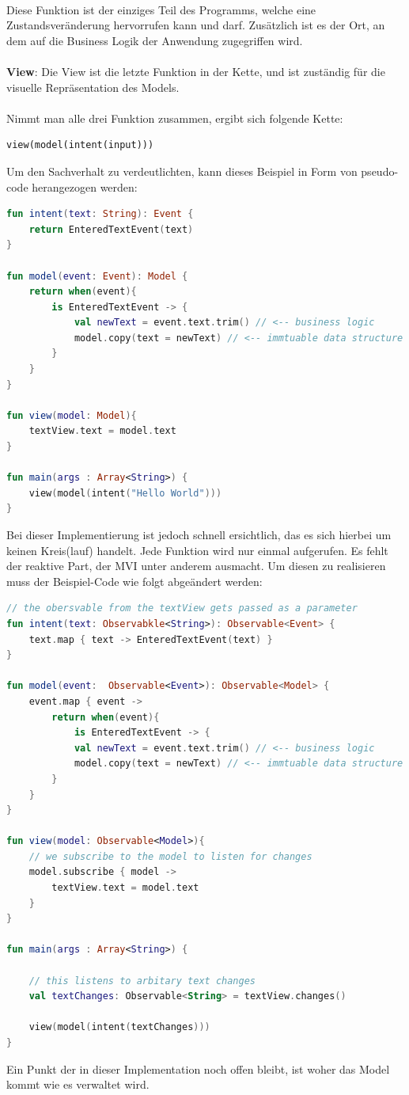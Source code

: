 \\
Diese Funktion ist der einziges Teil des Programms, welche eine Zustandsveränderung hervorrufen kann und darf.
Zusätzlich ist es der Ort, an dem auf die Business Logik der Anwendung zugegriffen wird.
\\
\\
\textbf{View}: Die View ist die letzte Funktion in der Kette, und ist zuständig für die visuelle Repräsentation des Models.
\\
\\
Nimmt man alle drei Funktion zusammen, ergibt sich folgende Kette:
\begin{lstlisting}[caption={funktion}, xleftmargin=.3\textwidth, frame=false, numbers=none]
view(model(intent(input)))
\end{lstlisting}
\newpage
Um den Sachverhalt zu verdeutlichten, kann dieses Beispiel in Form von pseudo-code herangezogen werden:
\begin{lstlisting}[caption={pseudo mvi implementation}, label={lst:pseudo-mvi}, language=Kotlin]
fun intent(text: String): Event {
	return EnteredTextEvent(text)
}

fun model(event: Event): Model {
	return when(event){
		is EnteredTextEvent -> {
			val newText = event.text.trim() // <-- business logic
			model.copy(text = newText) // <-- immtuable data structure
		}
	}
}

fun view(model: Model){
	textView.text = model.text 	
}

fun main(args : Array<String>) {
	view(model(intent("Hello World")))
}
\end{lstlisting}
Bei dieser Implementierung ist jedoch schnell ersichtlich, das es sich hierbei um keinen Kreis(lauf) handelt. Jede Funktion wird nur einmal aufgerufen. Es fehlt der reaktive Part, der MVI unter anderem ausmacht. Um diesen zu realisieren muss der Beispiel-Code wie folgt abgeändert werden:
\begin{lstlisting}[caption={pseudo mvi implementation},label={lst:pseudo-reactive-mvi},language=Kotlin]
// the obersvable from the textView gets passed as a parameter
fun intent(text: Observabkle<String>): Observable<Event> {
	text.map { text -> EnteredTextEvent(text) }
}

fun model(event:  Observable<Event>): Observable<Model> {
	event.map { event ->
		return when(event){
			is EnteredTextEvent -> {
			val newText = event.text.trim() // <-- business logic
			model.copy(text = newText) // <-- immtuable data structure
		}
	}	
}

fun view(model: Observable<Model>){
	// we subscribe to the model to listen for changes
	model.subscribe { model ->
		textView.text = model.text 	
	}	
}

fun main(args : Array<String>) {

	// this listens to arbitary text changes 
	val textChanges: Observable<String> = textView.changes()

	view(model(intent(textChanges))) 
}
\end{lstlisting}
Ein Punkt der in dieser Implementation noch offen bleibt, ist woher das Model kommt wie es verwaltet wird.

